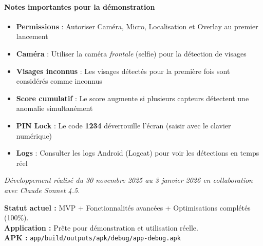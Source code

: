 \documentclass[11pt,a4paper]{article}
\begin{document}
\paragraph{Notes importantes pour la démonstration}
\begin{itemize}
    \item \textbf{Permissions} : Autoriser Caméra, Micro, Localisation et Overlay au premier lancement
    \item \textbf{Caméra} : Utiliser la caméra \textit{frontale} (selfie) pour la détection de visages
    \item \textbf{Visages inconnus} : Les visages détectés pour la première fois sont considérés comme inconnus
    \item \textbf{Score cumulatif} : Le score augmente si plusieurs capteurs détectent une anomalie simultanément
    \item \textbf{PIN Lock} : Le code \textbf{1234} déverrouille l'écran (saisir avec le clavier numérique)
    \item \textbf{Logs} : Consulter les logs Android (Logcat) pour voir les détections en temps réel
\end{itemize}

\vspace{4mm}
\noindent\textit{Développement réalisé du 30 novembre 2025 au 3 janvier 2026 en collaboration avec Claude Sonnet 4.5.}

\vspace{2mm}
\noindent\textbf{Statut actuel :} MVP + Fonctionnalités avancées + Optimisations complétés (100\%). \\
\noindent\textbf{Application :} Prête pour démonstration et utilisation réelle. \\
\noindent\textbf{APK :} \texttt{app/build/outputs/apk/debug/app-debug.apk}
\end{document}
